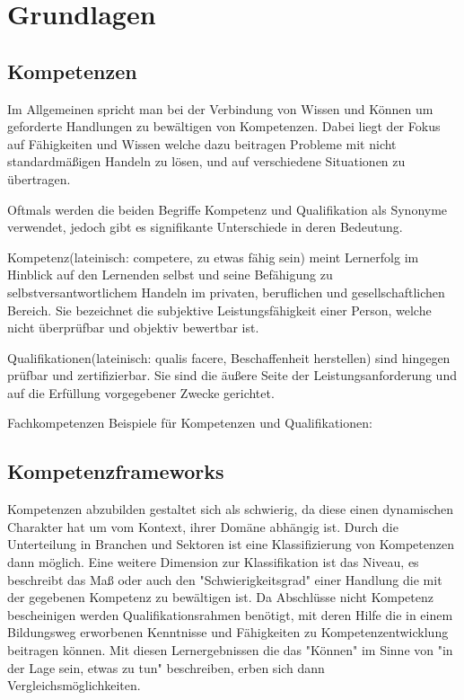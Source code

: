 \section{Grundlagen}\label{2_grundlagen}


\subsection{Kompetenzen}\label{competencies}

Im Allgemeinen spricht man bei der Verbindung von Wissen und Können um geforderte Handlungen zu bewältigen von Kompetenzen. Dabei liegt der Fokus auf Fähigkeiten und Wissen welche dazu beitragen Probleme mit nicht standardmäßigen Handeln zu lösen, und auf verschiedene Situationen zu übertragen.\cite{bibb}

Oftmals werden die beiden Begriffe Kompetenz und Qualifikation als Synonyme verwendet, jedoch gibt es signifikante Unterschiede in deren Bedeutung. 
\vspace{1em}
 
Kompetenz(lateinisch: competere, zu etwas fähig sein) meint Lernerfolg im Hinblick auf den Lernenden selbst und seine Befähigung zu selbstversantwortlichem Handeln im privaten, beruflichen und gesellschaftlichen Bereich. Sie bezeichnet die subjektive Leistungsfähigkeit einer Person, welche nicht überprüfbar und objektiv bewertbar ist.

Qualifikationen(lateinisch: qualis facere, Beschaffenheit herstellen) sind hingegen prüfbar und zertifizierbar. Sie sind die äußere Seite der Leistungsanforderung und auf die Erfüllung vorgegebener Zwecke gerichtet. 
 
Fachkompetenzen
Beispiele für Kompetenzen und Qualifikationen:

\subsection{Kompetenzframeworks}

Kompetenzen abzubilden gestaltet sich als schwierig, da diese einen dynamischen Charakter hat um vom Kontext, ihrer Domäne abhängig ist. Durch die Unterteilung in Branchen und Sektoren ist eine Klassifizierung von Kompetenzen dann möglich. Eine weitere Dimension zur Klassifikation ist das Niveau, es beschreibt das Maß oder auch den "Schwierigkeitsgrad" einer Handlung die mit der gegebenen Kompetenz zu bewältigen ist. 
\vspace{1em}
Da Abschlüsse nicht Kompetenz bescheinigen werden Qualifikationsrahmen benötigt, mit deren Hilfe die in einem Bildungsweg erworbenen Kenntnisse und Fähigkeiten zu Kompetenzentwicklung beitragen können. Mit diesen Lernergebnissen die das "Können" im Sinne von "in der Lage sein, etwas zu tun" beschreiben, erben sich dann Vergleichsmöglichkeiten.

